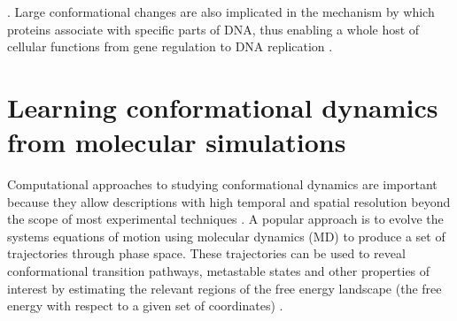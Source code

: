 \cite{bockenhauerConformationalDynamicsSingle2011a}. Large conformational changes are also implicated in the mechanism by which proteins associate with specific parts of DNA, thus enabling a whole host of cellular functions from gene regulation to DNA replication \cite{vandervaartCoupledBindingBending2015}.  

\section{Learning conformational dynamics from molecular simulations}

Computational approaches to studying conformational dynamics are important because they allow descriptions with high temporal and spatial resolution beyond the scope of most experimental techniques \cite{hugginsBiomolecularSimulationsDynamics2019}. A popular approach is to evolve the systems equations of motion using molecular dynamics (MD) to produce a set of trajectories through phase space. These trajectories can be used to reveal conformational transition pathways, metastable states and other properties of interest by estimating the relevant regions of the free energy landscape (the free energy with respect to a given set of coordinates)  \cite{rohrdanzDiscoveringMountainPasses2013a}.  

